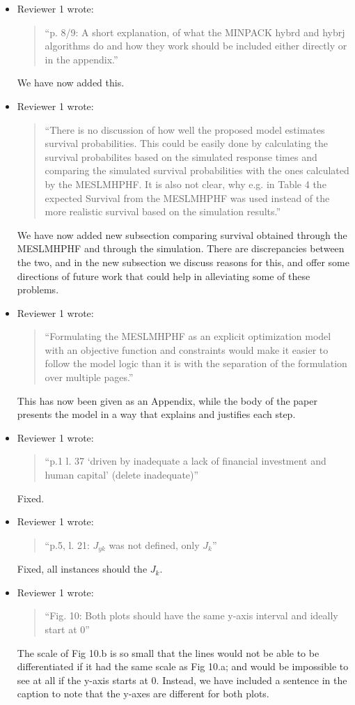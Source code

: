 \documentclass{article}
\begin{document}
\begin{itemize}
\item Reviewer 1 wrote:
\begin{quote}
``p. 8/9: A short explanation, of what the MINPACK hybrd and hybrj algorithms do and how they work should be included either directly or in the appendix.''
\end{quote}
We have now added this.

\item Reviewer 1 wrote:
\begin{quote}
``There is no discussion of how well the proposed model estimates survival probabilities. This could be easily done by calculating the survival probabilites based on the simulated response times and comparing the simulated survival probabilities with the ones calculated by the MESLMHPHF. It is also not clear, why e.g. in Table 4 the expected Survival from the MESLMHPHF was used instead of the more realistic survival based on the simulation results.''
\end{quote}
We have now added new subsection comparing survival obtained through the MESLMHPHF and through the simulation. There are discrepancies between the two, and in the new subsection we discuss reasons for this, and offer some directions of future work that could help in alleviating some of these problems.

\item Reviewer 1 wrote:
\begin{quote}
``Formulating the MESLMHPHF as an explicit optimization model with an objective function and constraints would make it easier to follow the model logic than it is with the separation of the formulation over multiple pages.''
\end{quote}
This has now been given as an Appendix, while the body of the paper presents the model in a way that explains and justifies each step.

\item Reviewer 1 wrote:
\begin{quote}
``p.1 l. 37 ‘driven by inadequate a lack of financial investment and human capital’ (delete inadequate)''
\end{quote}
Fixed.

\item Reviewer 1 wrote:
\begin{quote}
``p.5, l. 21: $J_{yk}$ was not defined, only $J_k$''
\end{quote}
Fixed, all instances should the $J_k$.

\item Reviewer 1 wrote:
\begin{quote}
``Fig. 10: Both plots should have the same y-axis interval and ideally start
at 0''
\end{quote}
The scale of Fig 10.b is so small that the lines would not be able to be differentiated if it had the same scale as Fig 10.a; and would be impossible to see at all if the y-axis starts at 0. Instead, we have included a sentence in the caption to note that the y-axes are different for both plots.


\end{itemize}
\end{document}
